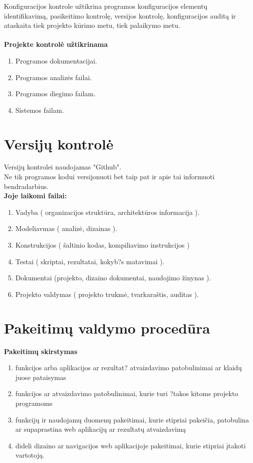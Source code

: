 \documentclass[a4paper,12pt]{article}
\begin{document}
Konfiguracijos kontrole u\v ztikrina programos konfiguracijos element\k u identifikavim\k a, pasikeitimo kontrol\k e, versijos kontrol\k e, konfiguracijos audit\k a ir ataskaita tiek projekto k\= urimo metu, tiek palaikymo metu.\\\\


\large\textbf{Projekte kontrol\. e u\v ztikrinama}
\normalsize
\begin{enumerate}
	\item Programos dokumentacijai.
	\item Programos analiz\. es failai.
	\item Programos diegimo failam.
	\item Sistemos failam.
\end{enumerate}

\clearpage

\section{Versij\k u kontrol\. e}

Versij\k u kontrolei naudojamas "Github".\\
Ne tik programos kodui versijonuoti bet taip pat ir apie tai informuoti bendradarbius.\\

\large\textbf{Joje laikomi failai:}
\normalsize
\begin{enumerate}

	\item Vadyba ( organizacijos strukt\= ura, architekt\= uros informacija ).
	\item Modeliavmas ( analiz\. e, dizainas ).
	\item Konstrukcijos ( \v saltinio kodas, kompiliavimo instrukcijos )
	\item Testai ( skriptai, rezultatai, kokyb?s matavimai ).
	\item Dokumentai (projekto, dizaino dokumentai, naudojimo \v zinynas ).
	\item Projekto valdymas ( projekto trukm\. e, tvarkara\v stis, auditas ).
		
\end{enumerate}
\clearpage 


\section{Pakeitimų valdymo procedūra}

\large\textbf{Pakeitimų skirstymas}
\begin{enumerate}
	\item funkcijos arba aplikacijos ar rezultat? atvaizdavimo patobulinimai ar klaid\k u juose pataisymas
	\item funkcijos ar atvaizdavimo patobulinimai, kurie turi ?takos kitoms projekto programoms
	\item funkcij\k u ir naudojam\k u duomen\k u pakeitimai, kurie stipriai pakei\v cia, patobulina ar supaprastina web aplikacij\k u ar rezultat\k u atvaizdavim\k a
	\item dideli dizaino ar navigacijos web aplikacijoje pakeitimai, kurie stipriai \k itakoti vartotoj\k a.
\end{enumerate}
\end{document}
